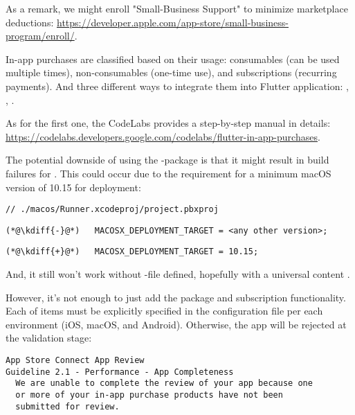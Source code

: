 \noindent As a remark, we might enroll "Small-Business Support" to minimize marketplace deductions:
\href{https://developer.apple.com/app-store/small-business-program/enroll/}{https://developer.apple.com/app-store/small-business-program/enroll/}.

In-app purchases are classified based on their usage: consumables (can be used multiple times), non-consumables 
(one-time use), and subscriptions (recurring payments). And three different ways to integrate them into Flutter 
application: , , . 

As for the first one, the CodeLabs provides a step-by-step manual in details:
\href{https://codelabs.developers.google.com/codelabs/flutter-in-app-purchases}{https://codelabs.developers.google.com/codelabs/flutter-in-app-purchases}.


\noindent The potential downside of using the -package is that it might result in build failures 
for . This could occur due to the requirement for a minimum macOS version of 10.15 for deployment:

\begin{lstlisting}
// ./macos/Runner.xcodeproj/project.pbxproj
\end{lstlisting}
{
\xpretocmd{\lstlisting}{\vspace{-12pt}}{}{}
\begin{lstlisting}[firstnumber=2, backgroundcolor=\color{backred}]
(*@\kdiff{-}@*)   MACOSX_DEPLOYMENT_TARGET = <any other version>;
\end{lstlisting}
\begin{lstlisting}[firstnumber=2, backgroundcolor=\color{backgreen}]
(*@\kdiff{+}@*)   MACOSX_DEPLOYMENT_TARGET = 10.15;
\end{lstlisting}
}

\noindent And, it still won't work without -file defined, hopefully with a universal content 
.

However, it's not enough to just add the package and subscription functionality. Each of items must be explicitly 
specified in the configuration file per each environment (iOS, macOS, and Android). Otherwise, the app will be rejected 
at the validation stage:

\begin{lstlisting}[language=terminal]
App Store Connect App Review 
Guideline 2.1 - Performance - App Completeness
  We are unable to complete the review of your app because one 
  or more of your in-app purchase products have not been 
  submitted for review.
\end{lstlisting}

